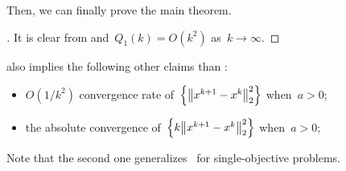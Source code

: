 \documentclass[../main]{subfiles}
\begin{document}
Then, we can finally prove the main theorem.
\begin{proof}[]
    It is clear from  and~$Q_1(k) = O(k^2)$ as~$k \to \infty$.
\end{proof}
\begin{remark}
     also implies the following other claims than :
    \begin{itemize}
        \item $O(1 / k^2)$ convergence rate of~$\set*{\norm*{x^{k + 1} - x^k}_2^2}$ when~$a > 0$;
        \item the absolute convergence of~$\set*{k \norm*{x^{k + 1} - x^k}_2^2}$ when~$a > 0$;
    \end{itemize}
    Note that the second one generalizes~\cite[Corollary~3.2]{Chambolle2015} for single-objective problems. 
\end{remark}
\end{document}
